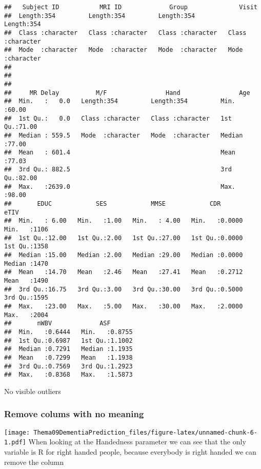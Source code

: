 \documentclass[
]{article}
\begin{document}
\begin{verbatim}
##   Subject ID           MRI ID             Group              Visit          
##  Length:354         Length:354         Length:354         Length:354        
##  Class :character   Class :character   Class :character   Class :character  
##  Mode  :character   Mode  :character   Mode  :character   Mode  :character  
##                                                                             
##                                                                             
##                                                                             
##     MR Delay          M/F                Hand                Age       
##  Min.   :   0.0   Length:354         Length:354         Min.   :60.00  
##  1st Qu.:   0.0   Class :character   Class :character   1st Qu.:71.00  
##  Median : 559.5   Mode  :character   Mode  :character   Median :77.00  
##  Mean   : 601.4                                         Mean   :77.03  
##  3rd Qu.: 882.5                                         3rd Qu.:82.00  
##  Max.   :2639.0                                         Max.   :98.00  
##       EDUC            SES            MMSE            CDR              eTIV     
##  Min.   : 6.00   Min.   :1.00   Min.   : 4.00   Min.   :0.0000   Min.   :1106  
##  1st Qu.:12.00   1st Qu.:2.00   1st Qu.:27.00   1st Qu.:0.0000   1st Qu.:1358  
##  Median :15.00   Median :2.00   Median :29.00   Median :0.0000   Median :1470  
##  Mean   :14.70   Mean   :2.46   Mean   :27.41   Mean   :0.2712   Mean   :1490  
##  3rd Qu.:16.75   3rd Qu.:3.00   3rd Qu.:30.00   3rd Qu.:0.5000   3rd Qu.:1595  
##  Max.   :23.00   Max.   :5.00   Max.   :30.00   Max.   :2.0000   Max.   :2004  
##       nWBV             ASF        
##  Min.   :0.6444   Min.   :0.8755  
##  1st Qu.:0.6987   1st Qu.:1.1002  
##  Median :0.7291   Median :1.1935  
##  Mean   :0.7299   Mean   :1.1938  
##  3rd Qu.:0.7569   3rd Qu.:1.2923  
##  Max.   :0.8368   Max.   :1.5873
\end{verbatim}

No visible outliers

\hypertarget{remove-colums-with-no-meaning}{%
\subsubsection{Remove colums with no
meaning}\label{remove-colums-with-no-meaning}}

\texttt{[image: Thema09DementiaPrediction\_files/figure-latex/unnamed-chunk-6-1.pdf]}
When looking at the Handedness parameter we can see that the only
variable is R for right handed people, because everybody is right handed
we can remove the column
\end{document}

